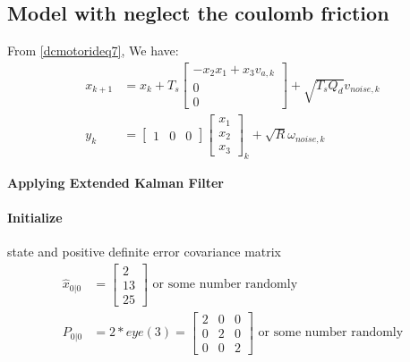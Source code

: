 	\subsection{Model with neglect the coulomb friction}
	From \autoref{dcmotorideq7}, We have:
	\[\begin{split}
		x_{k+1} &= x_k + T_s
		\begin{bmatrix}
			-x_2 x_1 + x_3 v_{a,k} \\
			0                      \\
			0                      
		\end{bmatrix} +\sqrt{T_s Q_d}v_{noise,k}\\
		y_k &= 
		\begin{bmatrix}
			1 & 0 & 0 
		\end{bmatrix}
		\begin{bmatrix}
			x_1 \\
			x_2 \\
			x_3 
		\end{bmatrix}_k+\sqrt{R}\omega_{noise,k}
	\end{split}\]


	\begin{center}
		\textbf{Applying Extended Kalman Filter}
	\end{center}
	\paragraph{Initialize} state and positive definite error covariance matrix
	\[\begin{split}
		\hat{x}_{0|0} &= \begin{bmatrix}
			2 \\
			13 \\
			25
		\end{bmatrix} \text{ or some number randomly}\\
		P_{0|0} &= 2*eye(3) = 
		\begin{bmatrix}
			2 & 0 & 0 \\
			0 & 2 & 0 \\
			0 & 0 & 2 
		\end{bmatrix} \text{ or some number randomly}
	\end{split}\]
	
